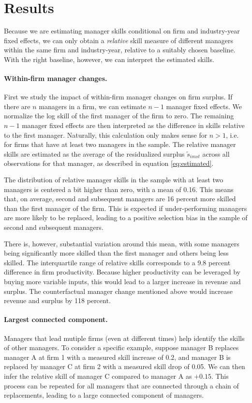 \documentclass[11pt,a4paper]{article}
\begin{document}
\section{Results}

Because we are estimating manager skills conditional on firm and industry-year fixed effects, we can only obtain a \emph{relative} skill measure of different managers within the same firm and industry-year, relative to a suitably chosen baseline. With the right baseline, however, we can interpret the estimated skills.

\paragraph{Within-firm manager changes.}
First we study the impact of within-firm manager changes on firm surplus. If there are $n$ managers in a firm, we can estimate $n-1$ manager fixed effects. We normalize the log skill of the first manager of the firm to zero. The remaining $n-1$ manager fixed effects are then interpreted as the difference in skills relative to the first manager. Naturally, this calculation only makes sense for $n>1$, i.e. for firms that have at least two managers in the sample. The relative manager skills are estimated as the average of the residualized surplus $\tilde s_{imst}$ across all observations for that manager, as described in equation \eqref{eq:estimated}. 

The distribution of relative manager skills in the sample with at least two managers is centered a bit higher than zero, with a mean of 0.16. This means that, on average, second and subsequent managers are 16 percent more skilled than the first manager of the firm. This is expected if under-performing managers are more likely to be replaced, leading to a positive selection bias in the sample of second and subsequent managers. 

There is, however, substantial variation around this mean, with some managers being significantly more skilled than the first manager and others being less skilled. The interquartile range of relative skills corresponds to a 9.8 percent difference in firm productivity. Because higher productivity can be leveraged by buying more variable inputs, this would lead to a larger increase in revenue and surplus. The counterfactual manager change mentioned above would increase revenue and surplus by 118 percent.


\paragraph{Largest connected component.}
Managers that lead mutiple firms (even at different times) help identify the skills of other managers. To consider a specific example, suppose manager B replaces manager A at firm 1 with a measured skill increase of 0.2, and manager B is replaced by manager C at firm 2 with a measured skill drop of 0.05. We can then infer the relative skill of manager C compared to manager A as $+0.15$. This process can be repeated for all managers that are connected through a chain of replacements, leading to a large connected component of managers.
\end{document}

